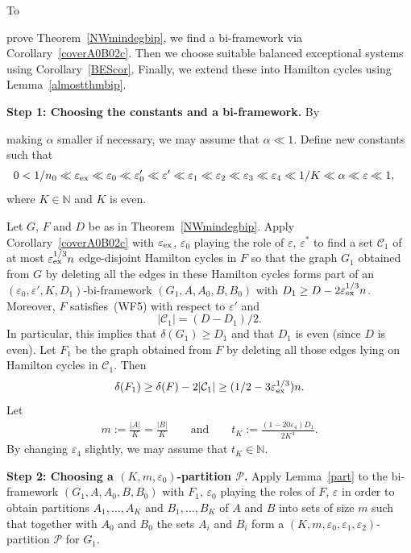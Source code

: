 \documentclass{memo-l}
\def\COMMENT#1{}
\def\cC{\mathcal{C}}
\def\cP{\mathcal{P}}
\def\eps{\varepsilon}
\def\epszero{\eps_0}
\numberwithin{section}{chapter}
\numberwithin{equation}{section}
\numberwithin{firstthm}{section}
\numberwithin{figure}{section}
\begin{document}
{To%
\COMMENT{osthus added para} 
prove Theorem~\ref{NWmindegbip}, we find a bi-framework via Corollary~\ref{coverA0B02c}.
Then we choose suitable balanced exceptional systems using Corollary~\ref{BEScor}.
Finally, we extend these into Hamilton cycles using Lemma~\ref{almostthmbip}.

\removelastskip{}\medskip{}
\noindent\textbf{Step 1: Choosing the constants and a bi-framework.}
By%
   \COMMENT{Daniela changed this proof substantially, eg bi-schemes are not used anymore. So read all of it again}
making $\alpha$ smaller if necessary, we may assume that $\alpha\ll 1$.
Define new constants such that 
\begin{align}
0 & < 1/n_0 \ll \eps_{\rm ex} \ll \epszero \ll \eps'_0\ll \eps' \ll \eps_1 \ll \eps_2 \ll \eps_3 \ll
\eps_4 \ll 1/K\ll \alpha \ll \eps\ll 1, \nonumber
\end{align}
where $K\in  \mathbb{N}$ and $K$ is even.%
\COMMENT{$\eps_3$ and $\eps_4$ are implicitly used when applying Corollary~\ref{BEScor}. }

Let $G$, $F$ and $D$ be as in Theorem~\ref{NWmindegbip}. 
Apply Corollary~\ref{coverA0B02c} with $\eps_{\rm ex}$, $\eps_0$ playing the role of $\eps$, $\eps^*$
to find a set $\cC_1$ of at most $\eps _{\rm ex} ^{1/3} n$ edge-disjoint Hamilton cycles in $F$ so that the graph $G_1$ obtained from $G$
by deleting all the edges in these Hamilton cycles forms part of an
$(\eps_0,\eps',K,D_1)$-bi-framework $(G_1,A,A_0,B,B_0)$ with $D_1 \ge D-2\eps_{\rm ex}^{1/3}n$.
Moreover, $F$ satisfies~(WF5) with respect to $\eps '$ and
\begin{equation}\label{eq:sizeC1}
|\cC_1|=(D-D_1)/2.
\end{equation}
In particular, this implies that $\delta (G_1) \geq D_1$ and that $D_1$ is even (since $D$ is even). 
Let $F_1$ be the graph obtained from $F$ by deleting all those edges lying on Hamilton cycles
in $\cC_1$. Then 
\begin{equation}\label{eq:degF1}
\delta(F_1) \ge \delta(F)-2|\cC_1|\ge (1/2-3\eps_{\rm ex}^{1/3})n.
\end{equation}
 Let
\begin{align*}
m :=\frac{|A|}{K}=\frac{|B|}{K} \qquad \text{and} \qquad t_{K}:=\frac{(1-20\eps_4)D_1}{2K^4}.
\end{align*}
By changing $\eps_4$ slightly, we may assume that $t_K\in\mathbb{N}$.

\smallskip

\noindent\textbf{Step 2: Choosing a $(K,m,\eps_0)$-partition $\cP$.}
Apply Lemma~\ref{part} to the bi-framework $(G_1,A,A_0,B,B_0)$ with $F_1$, $\eps_0$
playing the roles of $F$, $\eps$ in order to obtain partitions $A_1,\dots,A_{K}$ and
$B_1,\dots,B_{K}$ of $A$ and $B$ into sets of size $m$ such that together with $A_0$ and $B_0$ the sets
$A_i$ and $B_i$ form a $(K,m,\eps_0,\eps_1,\eps_2)$-partition $\cP$ for $G_1$.%

}
\end{document}
